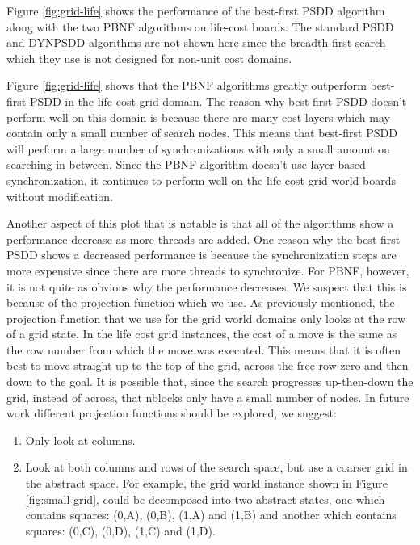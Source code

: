 \documentclass{article}
\begin{document}
Figure \ref{fig:grid-life} shows the performance of the best-first
PSDD algorithm along with the two PBNF algorithms on life-cost
boards.  The standard PSDD and DYNPSDD algorithms are not shown here
since the breadth-first search which they use is not designed for
non-unit cost domains.

Figure \ref{fig:grid-life} shows that the PBNF algorithms greatly
outperform best-first PSDD in the life cost grid domain.  The reason
why best-first PSDD doesn't perform well on this domain is because
there are many cost layers which may contain only a small number of
search nodes.  This means that best-first PSDD will perform a large
number of synchronizations with only a small amount on searching
in between.  Since the PBNF algorithm doesn't use layer-based
synchronization, it continues to perform well on the life-cost grid
world boards without modification.

Another aspect of this plot that is notable is that all of the
algorithms show a performance decrease as more threads are added.  One
reason why the best-first PSDD shows a decreased performance is
because the synchronization steps are more expensive since there are
more threads to synchronize.  For PBNF, however, it is not quite as
obvious why the performance decreases.  We suspect that this is
because of the projection function which we use.  As previously
mentioned, the projection function that we use for the grid world
domains only looks at the row of a grid state.  In the life cost grid
instances, the cost of a move is the same as the row number from which
the move was executed.  This means that it is often best to move
straight up to the top of the grid, across the free row-zero and then
down to the goal.  It is possible that, since the search progresses
up-then-down the grid, instead of across, that nblocks only have a
small number of nodes.  In future work different projection functions
should be explored, we suggest:
\begin{enumerate}
\item Only look at columns.
\item Look at both columns and rows of the search space, but use a
  coarser grid in the abstract space.  For example, the grid world
  instance shown in Figure \ref{fig:small-grid}, could be decomposed
  into two abstract states, one which contains squares: (0,A), (0,B),
  (1,A) and (1,B) and another which contains squares: (0,C), (0,D),
  (1,C) and (1,D).
\end{enumerate}
\end{document}
